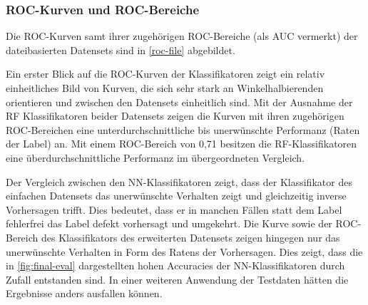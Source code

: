 \subsubsection*{ROC-Kurven und ROC-Bereiche}

Die ROC-Kurven samt ihrer zugehörigen ROC-Bereiche (als \glqq AUC\grqq{} vermerkt) der dateibasierten Datensets sind in \autoref{roc-file} abgebildet.

Ein erster Blick auf die ROC-Kurven der Klassifikatoren zeigt ein relativ einheitliches Bild von Kurven, die sich sehr stark an Winkelhalbierenden orientieren und zwischen den Datensets einheitlich sind. Mit der Ausnahme der RF Klassifikatoren beider Datensets zeigen die Kurven mit ihren zugehörigen ROC-Bereichen eine unterdurchschnittliche bis unerwünschte Performanz (\glqq Raten\grqq{} der Label) an. Mit einem ROC-Bereich von 0,71 besitzen die RF-Klassifikatoren eine überdurchschnittliche Performanz im übergeordneten Vergleich.

Der Vergleich zwischen den NN-Klassifikatoren zeigt, dass der Klassifikator des einfachen Datensets das unerwünschte Verhalten zeigt und gleichzeitig inverse Vorhersagen trifft. Dies bedeutet, dass er in manchen Fällen statt dem Label \glqq fehlerfrei\grqq{} das Label \glqq defekt\grqq{} vorhersagt und umgekehrt. Die Kurve sowie der ROC-Bereich des Klassifikators des erweiterten Datensets zeigen hingegen nur das unerwünschte Verhalten in Form des \glqq Ratens\grqq{} der Vorhersagen. Dies zeigt, dass die in \autoref{fig:final-eval} dargestellten hohen Accuracies der NN-Klassifikatoren durch Zufall entstanden sind. In einer weiteren Anwendung der Testdaten hätten die Ergebnisse anders ausfallen können.

